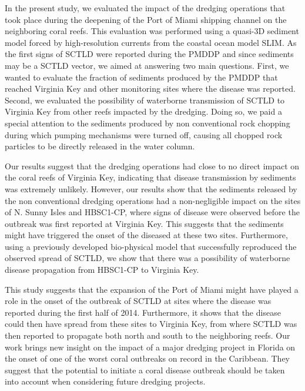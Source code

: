 In the present study, we evaluated the impact of the dredging operations that took place during the deepening of the Port of Miami shipping channel on the neighboring coral reefs. This evaluation was performed using a quasi-3D sediment model forced by high-resolution currents from the coastal ocean model SLIM. As the first signs of SCTLD were reported during the PMDDP and since sediments may be a SCTLD vector, we aimed at answering two main questions. First, we wanted to evaluate the fraction of sediments produced by the PMDDP that reached Virginia Key and other monitoring sites where the disease was reported. Second, we evaluated the possibility of waterborne transmission of SCTLD to Virginia Key from other reefs impacted by the dredging. Doing so, we paid a special attention to the sediments produced by non conventional rock chopping during which pumping mechanisms were turned off, causing all chopped rock particles to be directly released in the water column.

Our results suggest that the dredging operations had close to no direct impact on the coral reefs of Virginia Key, indicating that disease transmission by sediments was extremely unlikely. However, our results show that the sediments released by the non conventional dredging operations had a non-negligible impact on the sites of N. Sunny Isles and HBSC1-CP, where signs of disease were observed before the outbreak was first reported at Virginia Key. This suggests that the sediments might have triggered the onset of the diseased at these two sites. Furthermore, using a previously developed bio-physical model that successfully reproduced the observed spread of SCTLD, we show that there was a possibility of waterborne disease propagation from HBSC1-CP to Virginia Key.

This study suggests that the expansion of the Port of Miami might have played a role in the onset of the outbreak of SCTLD at sites where the disease was reported during the first half of 2014. Furthermore, it shows that the disease could then have spread from these sites to Virginia Key, from where SCTLD was then reported to propagate both north and south to the neighboring reefs. Our work brings new insight on the impact of a major dredging project in Florida on the onset of one of the worst coral outbreaks on record in the Caribbean. They suggest that the potential to initiate a coral disease outbreak should be taken into account when considering future dredging projects.

